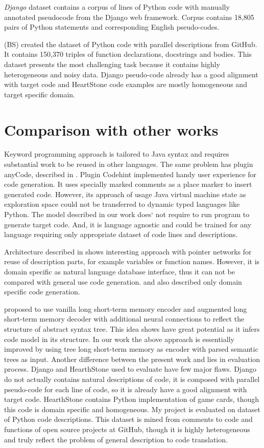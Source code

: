 \emph{Django} dataset \parencite{Oda2015} contains a corpus of lines of Python code with manually annotated pseudocode from the Django web framework. Corpus contains 18,805 pairs of Python statements and corresponding English pseudo-codes. 

\cite{Barone2017} (BS) created the dataset of Python code with parallel descriptions from GitHub. It contains 150,370 triples of function declarations, docstrings and bodies. This dataset presents the most challenging task because it contains highly heterogeneous and noisy data. Django pseudo-code already has a good alignment with target code and HeartStone code examples are mostly homogeneous and target specific domain.

\section{Comparison with other works}

Keyword programming approach \parencite{little2009keyword} is tailored to Java syntax and requires substantial work to be reused in other languages. The same problem has plugin anyCode, described in \cite{Gvero2015}. Plugin Codehint \parencite{Galenson2014} implemented handy user experience for code generation. It uses specially marked comments as a place marker to insert generated code. However, its approach of usage Java virtual machine state as exploration space could not be transferred to dynamic typed languages like Python. The model described in our work does` not require to run program to generate target code. And, it is language agnostic and could be trained for any language requiring only appropriate dataset of code lines and descriptions.

Architecture described in \cite{Zhong2017} shows interesting approach with pointer networks for reuse of description parts, for example variables or function names. However, it is domain specific as natural language database interface, thus it can not be compared with general use code generation. \cite{Chen2016} and \cite{Ling2016} also described only domain specific code generation.

\cite{Yin2017} proposed to use vanilla long short-term memory encoder and augmented long short-term memory decoder with additional neural connections to reflect the structure of abstract syntax tree. This idea shows have great potential as it infers code model in its structure. In our work the above approach is essentially improved by using tree long short-term memory as encoder with parsed semantic trees as input. Another difference between the present work and \cite{Yin2017} lies in evaluation process. Django and HearthStone used to evaluate \cite{Yin2017} have few major flaws. Django do not actually contains natural descriptions of code, it is composed with parallel pseudo-code for each line of code, so it is already have a good alignment with target code. HearthStone contains Python implementation of game cards, though this code is domain specific and homogeneous. My project is evaluated on \cite{Barone2017} dataset of Python code descriptions. This dataset is mined from comments to code and functions of open source projects at GitHub, though it is highly heterogeneous and truly reflect the problem of general description to code translation.